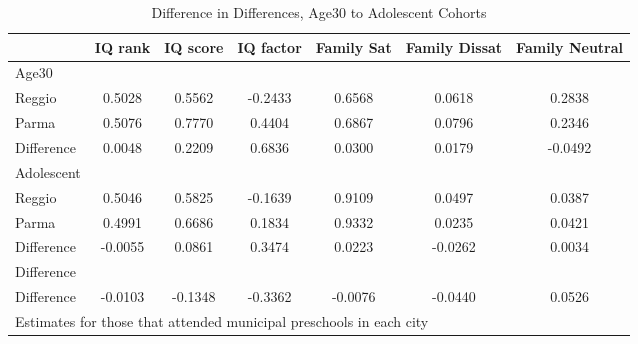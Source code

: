 \begin{table}[htbp]\centering
\caption{Difference in Differences, Age30 to Adolescent Cohorts}
\begin{tabular}{l*{6}{c}}
\hline\hline
            &     IQ rank&    IQ score&   IQ factor&  Family Sat&Family Dissat&Family Neutral\\
\hline
Age30       &            &            &            &            &            &            \\
Reggio      &      0.5028&      0.5562&     -0.2433&      0.6568&      0.0618&      0.2838\\
Parma       &      0.5076&      0.7770&      0.4404&      0.6867&      0.0796&      0.2346\\
Difference  &      0.0048&      0.2209&      0.6836&      0.0300&      0.0179&     -0.0492\\
\hline
Adolescent  &            &            &            &            &            &            \\
Reggio      &      0.5046&      0.5825&     -0.1639&      0.9109&      0.0497&      0.0387\\
Parma       &      0.4991&      0.6686&      0.1834&      0.9332&      0.0235&      0.0421\\
Difference  &     -0.0055&      0.0861&      0.3474&      0.0223&     -0.0262&      0.0034\\
\hline
Difference  &            &            &            &            &            &            \\
Difference  &     -0.0103&     -0.1348&     -0.3362&     -0.0076&     -0.0440&      0.0526\\
\hline\hline
\multicolumn{7}{l}{\footnotesize Estimates for those that attended municipal preschools in each city}\\
\end{tabular}
\end{table}
